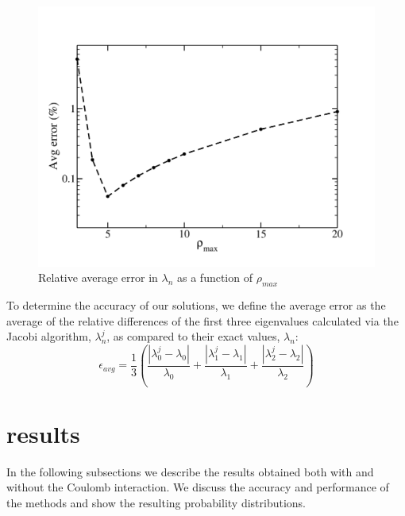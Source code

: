 \documentclass[prc,amsmath,twocolumn,superscriptaddress]{revtex4}
\begin{document}
\begin{figure}[t]
\includegraphics[scale=0.33]{error_pmax.pdf}
\caption{Relative average error in $\lambda_n$ as a function of $\rho_{max}$}
\label{err}
\end{figure}

To determine the accuracy of our solutions, we define the average error as the average of the relative differences of the first three eigenvalues calculated via the Jacobi algorithm, $\lambda_n^j$, as compared to their exact values, $\lambda_n$:
\begin{equation}
\epsilon_{avg}=\frac{1}{3}\left(\frac{|\lambda_0^{j}-\lambda_0|}{\lambda_0}
+\frac{|\lambda_1^{j}-\lambda_1|}{\lambda_1} +\frac{|\lambda_2^{j}-\lambda_2|}{\lambda_2} \right)
\end{equation}

\section{results}
\label{results}
In the following subsections we describe the results obtained both with and without the Coulomb interaction. We discuss the accuracy and performance of the methods and show the resulting probability distributions.
\end{document}
